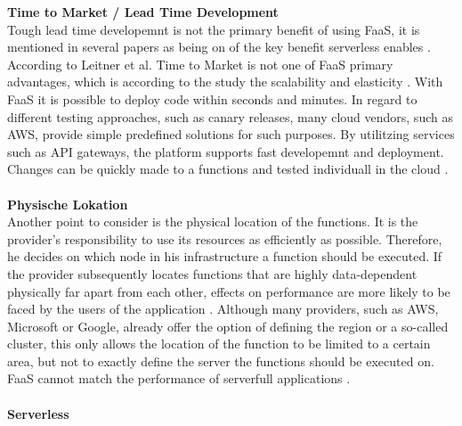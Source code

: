 \documentclass[11pt]{article}
\begin{document}
\textbf{Time to Market / Lead Time Development}\\
Tough lead time developemnt is not the primary benefit of using FaaS, it is mentioned in several papers as being on of the key benefit serverless enables \cite{adzic2017serverless} \cite{ast2017self}. According to Leitner et al. Time to Market is not one of FaaS primary advantages, which is according to the study the scalability and elasticity \cite{leitner2019mixed}. With FaaS it is possible to deploy code within seconds and minutes. In regard to different testing approaches, such as canary releases, many cloud vendors, such as AWS, provide simple predefined solutions for such purposes. By utilitzing services such as API gateways, the platform supports fast developemnt and deployment. Changes can be quickly made to a functions and tested individuall in the cloud \cite{sewak2018winning}.\\\\
\textbf{Physische Lokation}\\
Another point to consider is the physical location of the functions. It is the provider's responsibility to use its resources as efficiently as possible. Therefore, he decides on which node in his infrastructure a function should be executed. If the provider subsequently locates functions that are highly data-dependent physically far apart from each other, effects on performance are more likely to be faced by the users of the application \cite{shafiei2020serverless}. Although many providers, such as AWS, Microsoft or Google, already offer the option of defining the region or a so-called cluster, this only allows the location of the function to be limited to a certain area, but not to exactly define the server the functions should be executed on. FaaS cannot match the performance of serverfull applications \cite{shafiei2020serverless}.\\\\
\textbf{Serverless}\\
\end{document}

